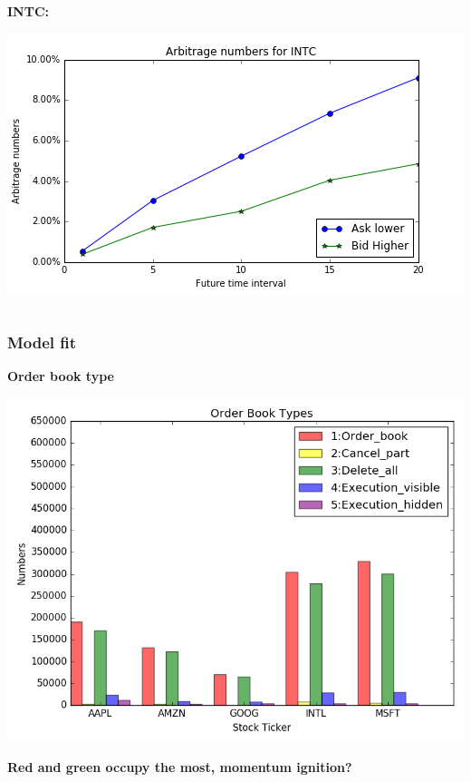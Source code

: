 \documentclass[xcolor={x11names,svgnames,dvipsnames}]{beamer}
\begin{document}
\begin{frame}
\begin{columns}
\begin{column}{.5\textwidth}
			 \textbf{INTC:}
	
										\includegraphics[width=1\textwidth, height=0.4\textheight]{INTC_arbitrage_time.png}

		\end{column}
	\end{columns}

\end{frame}



\begin{frame}
\frametitle{Model fit}
\textbf{Order book type}

\begin{center}	
\includegraphics[width=1\textwidth, height=0.7\textheight]{order_book_type.png}
\end{center}
\textbf{Red and green occupy the most, momentum ignition?}
\end{frame}
\end{document}

